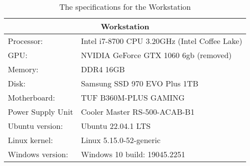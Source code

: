 \begin{table}[H]
    \centering
    \begin{tabular}{ll}
    \hline
    \multicolumn{2}{|c|}{Workstation}           \\ \hline
    Processor:   & Intel i7-8700 CPU 3.20GHz (Intel Coffee Lake)\\
    GPU:         & NVIDIA GeForce GTX 1060 6gb (removed) \\
    Memory:      & DDR4 16GB                     \\
    Disk:        & Samsung SSD 970 EVO Plus 1TB \\
    Motherboard: & TUF B360M-PLUS GAMING       \\
    Power Supply Unit & Cooler Master RS-500-ACAB-B1 \\
    Ubuntu version:  & Ubuntu 22.04.1 LTS        \\
    Linux kernel: & Linux 5.15.0-52-generic       \\
    Windows version:& Windows 10 build: 19045.2251
    \end{tabular}
    \caption{The specifications for the Workstation}
    \label{tab:komplett}
\end{table}